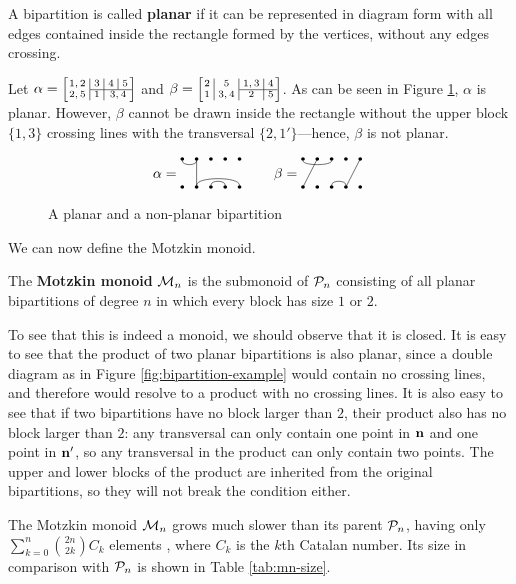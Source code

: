 \begin{definition}
  \label{def:planar}
  A bipartition is called \textbf{planar} if it can be represented in diagram
  form with all edges contained inside the rectangle formed by the vertices,
  without any edges crossing.
\end{definition}

\begin{example}
  Let $\alpha = \bipart{c|c|c|c}{2-4}{1,2 &3 &4 &5}{2,5 &1 &\mc2{c}{3,4}}$ and
  $\beta = \bipart{c|c|c|c}{3-4}{2 &5 &1,3 &4}{1 &3,4 &2 &5}$.  As can be seen
  in Figure \ref{fig:planar}, $\alpha$ is planar.  However, $\beta$ cannot be
  drawn inside the rectangle without the upper block $\{1,3\}$ crossing lines
  with the transversal $\{2, 1'\}$---hence, $\beta$ is not planar.
\end{example}

\begin{figure}[h]
  \centering
  $$\alpha = \bipartdiag{\tc12\tv22\bC25 \bc34} \qquad
  \beta = \bipartdiag{\tc13 \tv21 \tv54\bc34}$$
  \caption{A planar and a non-planar bipartition}
  \label{fig:planar}
\end{figure}

We can now define the Motzkin monoid.

\begin{definition}
  \label{def:motzkin}
  The \textbf{Motzkin monoid} $\mathcal{M}_n$ is the submonoid of $\mathcal{P}_n$ consisting
  of all planar bipartitions of degree $n$ in which every block has size $1$ or
  $2$.
\end{definition}

To see that this is indeed a monoid, we should observe that it is closed.  It is
easy to see that the product of two planar bipartitions is also planar, since a
double diagram as in Figure \ref{fig:bipartition-example} would contain no
crossing lines, and therefore would resolve to a product with no crossing lines.
It is also easy to see that if two bipartitions have no block larger than $2$,
their product also has no block larger than $2$: any transversal can only
contain one point in $\mathbf{n}$ and one point in $\mathbf{n}'$, so any transversal in the
product can only contain two points.  The upper and lower blocks of the product
are inherited from the original bipartitions, so they will not break the
condition either.

The Motzkin monoid $\mathcal{M}_n$ grows much slower than its parent $\mathcal{P}_n$, having
only $\sum_{k=0}^n \binom{2n}{2k}C_k$ elements \cite[A026945]{oeis}, where $C_k$
is the $k$th Catalan number.  Its size in comparison with $\mathcal{P}_n$ is
shown in Table \ref{tab:mn-size}.

